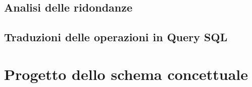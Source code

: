 \documentclass{article}
\begin{document}
\subsection{Analisi delle ridondanze}

 \subsection{Traduzioni delle operazioni in Query SQL}
 
 
 \section{Progetto dello schema concettuale}
 

% 
\end{document}
